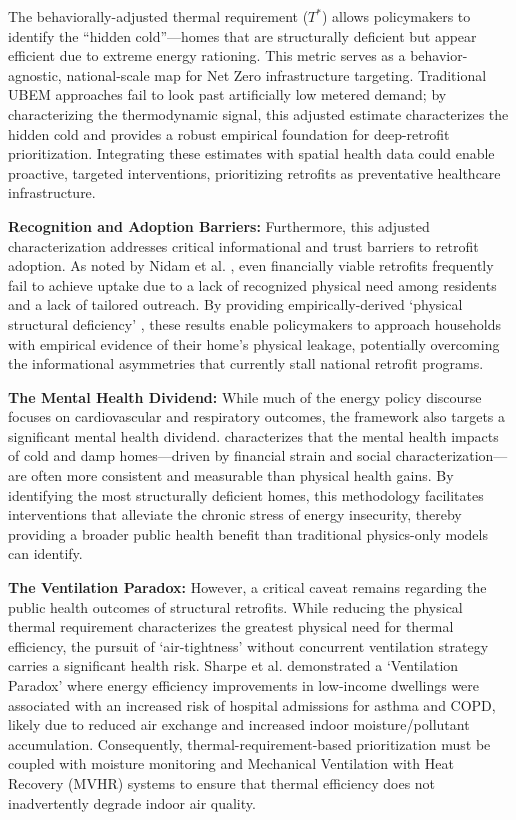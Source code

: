 \documentclass[11pt, a4paper, twocolumn]{article}
\begin{document}
The behaviorally-adjusted thermal requirement (\(T^*\)) allows policymakers to identify the 
``hidden cold''---homes that are structurally deficient but appear 
efficient due to extreme energy rationing. This metric serves as a 
behavior-agnostic, national-scale map for Net Zero infrastructure 
targeting. Traditional UBEM approaches fail to look past artificially 
low metered demand; by characterizing the thermodynamic signal, this adjusted estimate 
characterizes the hidden cold and provides a robust empirical foundation 
for deep-retrofit prioritization. Integrating these estimates with 
spatial health data could enable proactive, targeted interventions, 
prioritizing retrofits as preventative healthcare infrastructure.

\textbf{Recognition and Adoption Barriers:} Furthermore, this adjusted characterization 
addresses critical informational and trust barriers to retrofit adoption. 
As noted by Nidam et al. \cite{Nidam2023}, even financially viable retrofits 
frequently fail to achieve uptake due to a lack of recognized physical 
need among residents and a lack of tailored outreach. By providing 
empirically-derived `physical structural deficiency' , these results enable 
policymakers to approach households with empirical evidence of their 
home's physical leakage, potentially overcoming the informational 
asymmetries that currently stall national retrofit programs.

\textbf{The Mental Health Dividend:} While much of the energy policy 
discourse focuses on cardiovascular and respiratory outcomes, the framework 
also targets a significant mental health dividend. \cite{Liddell2010} 
characterizes that the mental health impacts of cold and damp homes—driven 
by financial strain and social characterization—are often more consistent and 
measurable than physical health gains. By identifying the most 
structurally deficient homes, this methodology facilitates 
interventions that alleviate the chronic stress of energy insecurity, 
thereby providing a broader public health benefit than traditional 
physics-only models can identify.

\textbf{The Ventilation Paradox:} However, a critical caveat remains regarding the public health outcomes of structural retrofits. While reducing the physical thermal requirement characterizes the greatest physical need for thermal efficiency, the pursuit of `air-tightness' without concurrent ventilation strategy carries a significant health risk. Sharpe et al. \cite{Sharpe2019}  demonstrated a `Ventilation Paradox' where energy efficiency improvements in low-income dwellings were associated with an increased risk of hospital admissions for asthma and COPD, likely due to reduced air exchange and increased indoor moisture/pollutant accumulation. Consequently, thermal-requirement-based prioritization must be coupled with moisture monitoring and Mechanical Ventilation with Heat Recovery (MVHR) systems to ensure that thermal efficiency does not inadvertently degrade indoor air quality.
\end{document}

